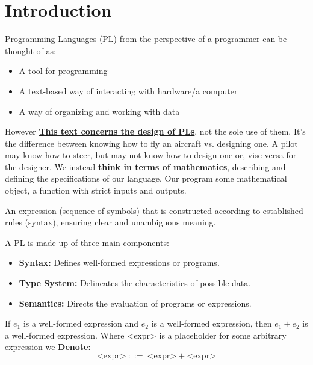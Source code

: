 \section{Introduction}

Programming Languages (PL) from the perspective of a programmer can be thought of as:
\begin{itemize}
    \item  A tool for programming
    \item A text-based way of interacting
    with hardware/a computer
    \item A way of organizing and working
    with data
\end{itemize}

However \textbf{\underline{This text concerns the design of 
PLs}}, not the sole use of them. It's the difference between knowing how to fly 
an aircraft vs. designing one. A pilot may know how to steer, but 
may not know how to design one or, vise versa for the designer.
We instead \textbf{\underline{think in terms of mathematics}}, describing and defining
the specifications of our language. Our program some mathematical object,
a function with strict inputs and outputs.
\begin{Def}

    An expression (sequence of symbols) that is constructed according to established rules (syntax),
    ensuring clear and unambiguous meaning.

\end{Def}
\begin{Def}

    A PL is made up of three main components:
    \begin{itemize}
        \item \textbf{Syntax:} Defines well-formed expressions or programs.
        \item \textbf{Type System:} Delineates the characteristics of possible data.
        \item \textbf{Semantics:} Directs the evaluation of programs or expressions.
    \end{itemize}
\end{Def}

\vspace{-1em}
\begin{Example}[Syntax:]

    \label{ex:well_formed_expr}
    If $e_1$ is a well-formed expression and $e_2$ is a well-formed expression, 
    then $e_1+e_2$ is a well-formed expression. Where <expr> is a placeholder for some arbitrary expression we \textbf{Denote:}
    \[\text{<expr>}\ ::=\ \text{<expr>}+\text{<expr>}\]
\end{Example}

